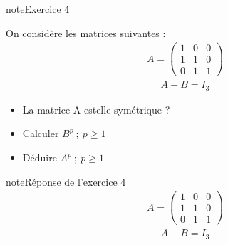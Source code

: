 \documentclass[letterpaper,10pt,french]{jupyterBook}
\begin{document}
\begin{sphinxadmonition}{note}{Exercice 4}

\sphinxAtStartPar
On considère les matrices suivantes :
\begin{equation*}
\begin{split}
A = \begin{pmatrix}
1 & 0 & 0 \\
1 & 1 & 0  \\
0 & 1 & 1 
\end{pmatrix}
\end{split}
\end{equation*}\begin{equation*}
\begin{split}
A - B = I_3
\end{split}
\end{equation*}\begin{itemize}
\item {} 
\sphinxAtStartPar
La matrice A est\sphinxhyphen{}elle symétrique ?

\item {} 
\sphinxAtStartPar
Calculer \(B^p ~;~ p \ge 1\)

\item {} 
\sphinxAtStartPar
Déduire \(A^p ~;~ p \ge 1\)

\end{itemize}
\end{sphinxadmonition}

\begin{sphinxadmonition}{note}{Réponse de l’exercice 4}
\begin{equation*}
\begin{split}
A = \begin{pmatrix}
1 & 0 & 0 \\
1 & 1 & 0  \\
0 & 1 & 1 
\end{pmatrix}
\end{split}
\end{equation*}\begin{equation*}
\begin{split}
A - B = I_3
\end{split}
\end{equation*}\end{sphinxadmonition}
\end{document}
